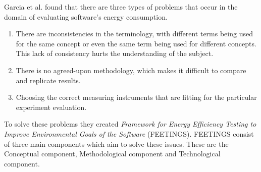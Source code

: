 



Garcia et al. found that there are three types of problems that occur in the domain of evaluating software's energy consumption.\cite{GarciaFEETINGS} 
\begin{enumerate}
    \item There are inconsistencies in the terminology, with different terms being used for the same concept or even the same term being used for different concepts. This lack of consistency hurts the understanding of the subject.
    \item There is no agreed-upon methodology, which makes it difficult to compare and replicate results.
    \item Choosing the correct measuring instruments that are fitting for the particular experiment evaluation.
\end{enumerate}

To solve these problems they created \textit{Framework for Energy Efficiency Testing to Improve Environmental Goals of the Software} (FEETINGS). FEETINGS consist of three main components which aim to solve these issues. These are the Conceptual component, Methodological component and Technological component.\cite{GarciaFEETINGS}\nytafsnit

%

